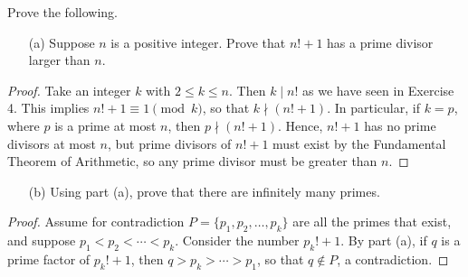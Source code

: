 \documentclass{article}
\begin{document}
\begin{exercise}
Prove the following.
\begin{itemize}
    \item[(a)] Suppose $n$ is a positive integer. Prove that $n! + 1$ has a prime divisor larger than $n$.
\end{itemize}
\begin{proof}
Take an integer $k$ with $2\leq k \leq n$. Then $k\mid n!$ as we have seen in Exercise 4. This implies $n! + 1\equiv 1\pmod k$, so that $k\nmid (n! + 1)$. In particular, if $k=p$, where $p$ is a prime at most $n$, then $p\nmid (n! + 1)$. Hence, $n!+1$ has no prime divisors at most $n$, but prime divisors of $n! + 1$ must exist by the Fundamental Theorem of Arithmetic, so any prime divisor must be greater than $n$.
\end{proof}
\begin{itemize}
    \item[(b)] Using part (a), prove that there are infinitely many primes.
\end{itemize}
\begin{proof}
Assume for contradiction $P = \{p_1, p_2,\ldots, p_k\}$ are all the primes that exist, and suppose $p_1 < p_2 < \cdots < p_k$. Consider the number $p_k! + 1$. By part (a), if $q$ is a prime factor of $p_k! + 1$, then $q > p_k > \cdots > p_1$, so that $q\not\in P$, a contradiction.
\end{proof}
\end{exercise}
\end{document}
